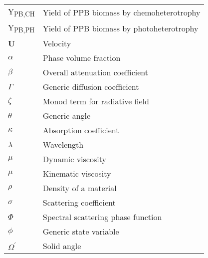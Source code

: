 \begin{center}
\begin{longtable}{ll}
Y\textsubscript{PB,CH}	&	Yield of PPB biomass by chemoheterotrophy	\\
Y\textsubscript{PB,PH}	&	Yield of PPB biomass by photoheterotrophy	\\
\textbf{U}	&	Velocity	\\
$\alpha$	&	Phase volume fraction	\\
$\beta$	&	Overall attenuation coefficient	\\
$\Gamma$	&	Generic diffusion coefficient	\\
$\zeta$	&	Monod term for radiative field	\\
$\theta$	&	Generic angle	\\
$\kappa$	&	Absorption coefficient	\\
$\lambda$	&	Wavelength	\\
$\mu$	&	Dynamic viscosity	\\
$\mu$	&	Kinematic viscosity	\\
$\rho$	&	Density of a material	\\
$\sigma$	&	Scattering coefficient	\\
$\Phi$	&	Spectral scattering phase function	\\
$\phi$	&	Generic state variable	\\
$\Omega ^\prime	$ &	Solid angle	\\
	\hline
	\end{longtable}
\end{center}


